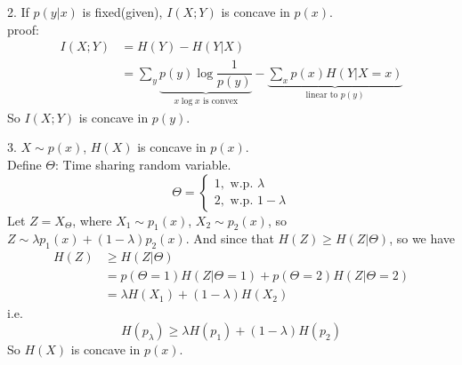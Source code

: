 2. If $p(y|x)$ is fixed(given), $I(X;Y)$ is concave in $p(x)$.\\
proof:
\begin{align*}
I(X;Y) &= H(Y) - H(Y|X) \\
&= \sum_{y}\underbrace{p(y)\log\dfrac{1}{p(y)}}_{x\log x \text{\ is convex}} - \underbrace{\sum_{x}p(x)H(Y|X=x)}_{\text{linear to } p(y)}
\end{align*}
So $I(X;Y)$ is concave in $p(y)$.

3. $X\sim p(x)$, $H(X)$ is concave in $p(x)$. \\
Define $\Theta$: Time sharing random variable. \\
$$\Theta=\left\{\begin{array}{l}1, \text{\ \ \ w.p.\ \ } \lambda \\2, \text{\ \ \ w.p.\ \ } 1-\lambda\end{array}\right.$$
Let $Z=X_{\Theta}$, where $X_1\sim p_1(x)$, $X_2\sim p_2(x)$, so $Z\sim \lambda p_1(x)+(1-\lambda)p_2(x)$.
And since that $H(Z)\geq H(Z|\Theta)$, so we have
\begin{align*}
H(Z) &\geq H(Z|\Theta) \\
&= p(\Theta=1)H(Z|\Theta=1)+p(\Theta=2)H(Z|\Theta=2) \\
&= \lambda H(X_1) + (1-\lambda)H(X_2)
\end{align*}
i.e. $$H(p_{\lambda})\geq \lambda H(p_1) + (1-\lambda)H(p_2)$$
So $H(X)$ is concave in $p(x)$.

